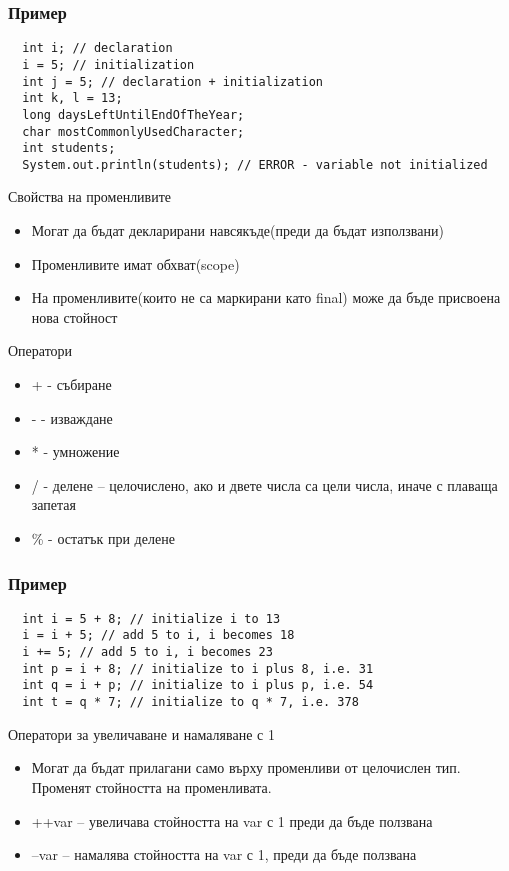 \documentclass{beamer}
\begin{document}
\begin{frame}[fragile]
  \frametitle{Пример}
  \transdissolve
\begin{lstlisting}
  int i; // declaration
  i = 5; // initialization
  int j = 5; // declaration + initialization
  int k, l = 13;
  long daysLeftUntilEndOfTheYear;
  char mostCommonlyUsedCharacter;
  int students;
  System.out.println(students); // ERROR - variable not initialized
\end{lstlisting}
\end{frame}

\begin{frame}{Свойства на променливите}
  \transdissolve
  \begin{itemize}
  \item Могат да бъдат декларирани навсякъде(преди да бъдат
    използвани)
  \item Променливите имат обхват(scope)
  \item На променливите(които не са маркирани като final) може да бъде
    присвоена нова стойност
  \end{itemize}
\end{frame}

\begin{frame}{Оператори}
  \transdissolve
  \begin{itemize}
  \item + - събиране
  \item - - изваждане
  \item * - умножение
  \item / - делене – целочислено, ако и двете
    числа са цели числа, иначе с плаваща
    запетая
  \item \% - остатък при делене
  \end{itemize}
\end{frame}

\begin{frame}[fragile]
  \frametitle{Пример}
  \transdissolve
\begin{lstlisting}
  int i = 5 + 8; // initialize i to 13
  i = i + 5; // add 5 to i, i becomes 18
  i += 5; // add 5 to i, i becomes 23
  int p = i + 8; // initialize to i plus 8, i.e. 31
  int q = i + p; // initialize to i plus p, i.e. 54
  int t = q * 7; // initialize to q * 7, i.e. 378
\end{lstlisting}
\end{frame}


\begin{frame}{Оператори за увеличаване и намаляване с 1}
  \transdissolve
  \begin{itemize}
  \item   Могат да бъдат прилагани само върху
    променливи от целочислен тип.
    Променят стойността на променливата.

   \item ++var – увеличава стойността на var с 1
    преди да бъде ползвана

   \item --var – намалява стойността на var с 1,
    преди да бъде ползвана

  \end{itemize}
\end{frame}
\end{document}
